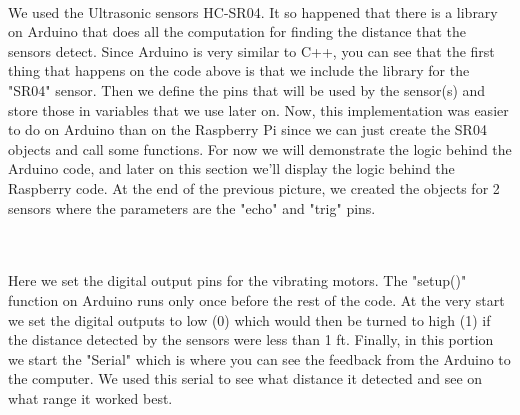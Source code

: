 \documentclass[letterpaper,12pt]{article}
\begin{document}
\\

We used the Ultrasonic sensors HC-SR04. It so happened that there is a library on Arduino that does all the computation for finding the distance that the sensors detect. Since Arduino is very similar to C++, you can see that the first thing that happens on the code above is that we include the library for the "SR04" sensor. Then we define the pins that will be used by the sensor(s) and store those in variables that we use later on. Now, this implementation was easier to do on Arduino than on the Raspberry Pi since we can just create the SR04 objects and call some functions. For now we will demonstrate the logic behind the Arduino code, and later on this section we'll display the logic behind the Raspberry code. At the end of the previous picture, we created the objects for 2 sensors where the parameters are the "echo" and "trig" pins. \par \ \\

\\

Here we set the digital output pins for the vibrating motors. The "setup()" function on Arduino runs only once before the rest of the code. At the very start we set the digital outputs to low (0) which would then be turned to high (1) if the distance detected by the sensors were less than 1 ft. Finally, in this portion we start the "Serial" which is where you can see the feedback from the Arduino to the computer. We used this serial to see what distance it detected and see on what range it worked best. \par \ \\

\\
\end{document}
